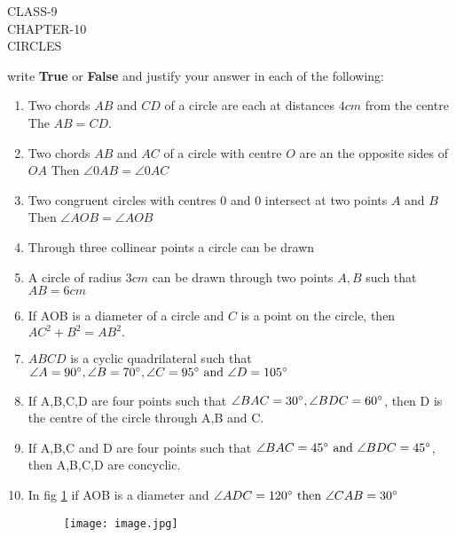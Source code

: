 \documentclass[12pt]{article}
\begin{document}
\begin{center}
\textbf\large{CLASS-9\\CHAPTER-10 \\ CIRCLES}
\end{center}
write \textbf{True} or \textbf{False} and justify your answer in each of the following:
\begin{enumerate}
\item Two chords $AB$ and $CD$ of a circle are each at distances $4 cm$ from the centre The $AB=CD$.
\item Two chords $AB$ and $AC$ of a circle with centre $O$ are an the opposite sides of $OA$ Then $\angle 0AB = \angle 0AC$
\item Two congruent circles with centres 0 and 0 intersect at two points $A$ and $B$ Then $\angle AOB= \angle AOB$
\item Through three collinear points a circle can be drawn
\item A circle of radius $3 cm$ can be drawn through two points $A,B$ such that $AB= 6cm$
\item If AOB is a diameter of a circle and $C$ is a point on the circle, then $AC^2+B^2=AB^2.$
\item $ABCD$ is a cyclic quadrilateral such that $\angle A=90\degree ,\angle B=70\degree, \angle C=95\degree \text{ and }\angle D=105\degree$
\item If A,B,C,D are four points such that $\angle BAC=30\degree, \angle BDC=60\degree$, then D is the centre of the circle through A,B  and C.
\item If A,B,C and D are four points such that $\angle BAC =45\degree \text{ and }\angle BDC=45\degree$, then A,B,C,D are concyclic.
\item In fig \ref{fig:1} if AOB is a diameter and $\angle ADC=120\degree \text{ then }\angle CAB=30\degree$
\begin{figure}[h!]
 \begin{center} 
	 \texttt{[image: image.jpg]}
 \end{center}
\caption{}
	\label{fig:1}
\end{figure}
\end{enumerate}
\end{document}

